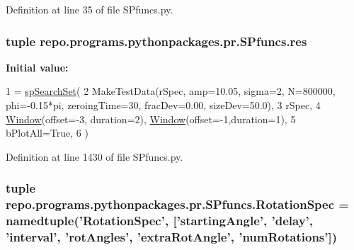 Definition at line 35 of file S\-Pfuncs.\-py.

\hypertarget{namespacerepo_1_1programs_1_1pythonpackages_1_1pr_1_1SPfuncs_ab8ea55b3a0adfc5e8090a9a40db96e5a}{
\subsubsection[{res}]{\setlength{\rightskip}{0pt plus 5cm}tuple repo.\-programs.\-pythonpackages.\-pr.\-S\-Pfuncs.\-res}}\label{namespacerepo_1_1programs_1_1pythonpackages_1_1pr_1_1SPfuncs_ab8ea55b3a0adfc5e8090a9a40db96e5a}
{\bfseries Initial value\-:}
\begin{DoxyCode}
1 = \hyperlink{namespacerepo_1_1programs_1_1pythonpackages_1_1pr_1_1SPfuncs_a1aca1da7012fa44af8ba6fb057c7ed1b}{spSearchSet}(
2             MakeTestData(rSpec, amp=10.05, sigma=2, N=800000, phi=-0.15*pi, zeroingTime=30, fracDev=0.00, 
      sizeDev=50.0),
3             rSpec,
4             \hyperlink{namespacerepo_1_1programs_1_1pythonpackages_1_1pr_1_1SPfuncs_a5f881c246a0ac49955b33746df6c379b}{Window}(offset=-3, duration=2), \hyperlink{namespacerepo_1_1programs_1_1pythonpackages_1_1pr_1_1SPfuncs_a5f881c246a0ac49955b33746df6c379b}{Window}(offset=-1,duration=1),
5             bPlotAll=\textcolor{keyword}{True},
6             )
\end{DoxyCode}


Definition at line 1430 of file S\-Pfuncs.\-py.

\hypertarget{namespacerepo_1_1programs_1_1pythonpackages_1_1pr_1_1SPfuncs_abeb96363789885a36812850590fbfbab}{
\subsubsection[{Rotation\-Spec}]{\setlength{\rightskip}{0pt plus 5cm}tuple repo.\-programs.\-pythonpackages.\-pr.\-S\-Pfuncs.\-Rotation\-Spec = namedtuple('Rotation\-Spec', \mbox{[}'starting\-Angle', 'delay', 'interval', 'rot\-Angles', 'extra\-Rot\-Angle', 'num\-Rotations'\mbox{]})}}\label{namespacerepo_1_1programs_1_1pythonpackages_1_1pr_1_1SPfuncs_abeb96363789885a36812850590fbfbab}


